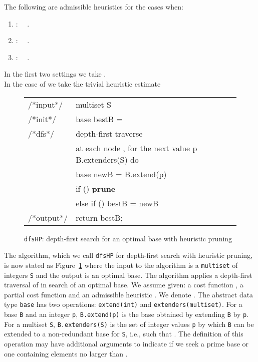 \documentclass[envcountsame]{llncs}
\newenvironment{SProg2}
     {\begin{small}\begin{tt}\begin{tabular}[c]{ll}}{\end{tabular}\end{tt}\end{small}}
\newcommand{\qin}{\hspace*{0.15in}}
\begin{document}
\begin{lemma}
\label{lem:h}
  The following are
    admissible heuristics for the cases when: 
  \begin{enumerate}
  \item :~~
.
  \item :~~
.

  \item :~~
   .
\end{enumerate}
In the first two settings we take   
. \\
In the case of  we take the  trivial heuristic estimate

\end{lemma}




\begin{figure}[t]
\begin{SProg2}  
  {\scriptsize /*input*/} &multiset S\\
  {\scriptsize /*init*/}  &  base  bestB =  \\
{\scriptsize /*dfs*/} & depth-first traverse \\
                        & at each node , 
                          for the next value  p  B.extenders(S) do\\
             &\qin\qin base newB = B.extend(p)\\
             &\qin\qin if () \textbf{prune}\\
             &\qin\qin  else if () 
                                           bestB = newB \\                  
   {\scriptsize /*output*/} & return bestB;\\
\end{SProg2}
\caption{\texttt{dfsHP}: depth-first search for an
  optimal base with heuristic pruning}
\label{fig:alg1}
\vspace{-3ex}
\end{figure}


The algorithm, which we call \texttt{dfsHP} for depth-first search
with heuristic pruning, is now stated as Figure~\ref{fig:alg1} where
the input to the algorithm is a \texttt{multiset} of integers
\texttt{S} and the output is an optimal base. The algorithm applies a
depth-first traversal of  in search of an optimal base.
We assume given: a cost function , a partial cost function
 and an admissible heuristic . We denote
.
The abstract data type \texttt{base} has two operations:
\texttt{extend(int)} and \texttt{extenders(multiset)}. For a base
\texttt{B} and an integer \texttt{p}, \texttt{B.extend(p)} is the base
obtained by extending \texttt{B} by \texttt{p}. For a multiset
\texttt{S}, \texttt{B.extenders(S)} is the set of integer values
\texttt{p} by which \texttt{B} can be extended to a non-redundant base
for \texttt{S}, i.e., such that .  The definition of this operation may have
additional arguments to indicate if we seek a prime base or one
containing elements no larger than .
\end{document}
